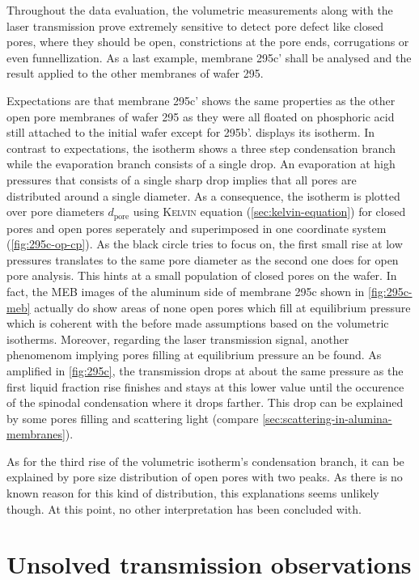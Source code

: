 \documentclass[../thesis.tex]{subfiles}
\begin{document}
            Throughout the data evaluation, the volumetric measurements along with the laser transmission prove extremely sensitive to detect pore defect like closed pores, where they should be open, constrictions at the pore ends, corrugations or even funnellization. As a last example, membrane 295c' shall be analysed and the result applied to the other membranes of wafer 295.

            Expectations are that membrane 295c' shows the same properties as the other open pore membranes of wafer 295 as they were all floated on phosphoric acid still attached to the initial wafer except for 295b'.  displays its isotherm. In contrast to expectations, the isotherm shows a three step condensation branch while the evaporation branch consists of a single drop. An evaporation at high pressures that consists of a single sharp drop implies that all pores are distributed around a single diameter. As a consequence, the isotherm is plotted over pore diameters $d_\mathrm{pore}$ using \textsc{Kelvin} equation (\cref{sec:kelvin-equation}) for closed pores and open pores seperately and superimposed in one coordinate system (\cref{fig:295c-op-cp}). As the black circle tries to focus on, the first small rise at low pressures translates to the same pore diameter as the second one does for open pore analysis. This hints at a small population of closed pores on the wafer. In fact, the MEB images of the aluminum side of membrane 295c shown in \cref{fig:295c-meb} actually do show areas of none open pores which fill at equilibrium pressure which is coherent with the before made assumptions based on the volumetric isotherms. Moreover, regarding the laser transmission signal, another phenomenom implying pores filling at equilibrium pressure an be found. As amplified in \cref{fig:295c}, the transmission drops at about the same pressure as the first liquid fraction rise finishes and stays at this lower value until the occurence of the spinodal condensation where it drops farther. This drop can be explained by some pores filling and scattering light (compare \cref{sec:scattering-in-alumina-membranes}).

            As for the third rise of the volumetric isotherm's condensation branch, it can be explained by pore size distribution of open pores with two peaks. As there is no known reason for this kind of distribution, this explanations seems unlikely though. At this point, no other interpretation has been concluded with.


    \section{Unsolved transmission observations}
    \label{sec:unsolved-transmission}
\end{document}
